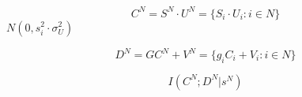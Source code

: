 \begin{equation}
C^N= S^N \cdot U^N = \{ S_i\cdot U_i : i \in N \}
\end{equation}
$N(0, s_i^2 \cdot \sigma^2_U)$

\begin{equation}
D^N= GC^N + V^N = \{ g_i C_i + V_i : i \in N \}
\end{equation}

\begin{equation}
I(C^N; D^N|s^N) 
\end{equation}